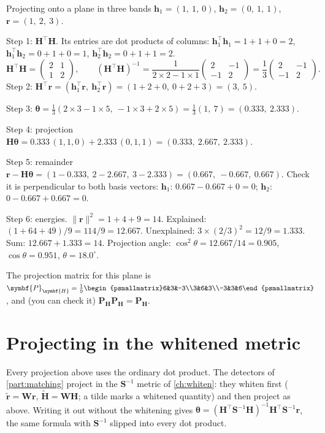 \documentclass[11pt,a4paper,oneside,openany]{book}
\newcommand{\B}[1]{{\symbf{#1}}}
\newcommand{\B}[1]{{\bm{#1}}}
\newcommand{\T}{^{\top}}
\newcommand{\nrm}[1]{\lVert #1\rVert}
\newcommand{\vr}{\B{r}}
\newcommand{\vh}{\B{h}}
\newcommand{\vtheta}{\B{\theta}}
\newcommand{\mS}{\B{S}}
\newcommand{\mW}{\B{W}}
\newcommand{\mH}{\B{H}}
\newcommand{\mP}{\B{P}}
\begin{document}
\begin{worked}[label=we:projsub]{Projecting onto a plane in three bands}
$\vh_1=(1,\ 1,\ 0)$, $\vh_2=(0,\ 1,\ 1)$, $\vr=(1,\ 2,\ 3)$.

Step 1: $\mH\T\mH$. Its entries are dot products of columns: $\vh_1\T\vh_1=1+1+0=2$, $\vh_1\T\vh_2=0+1+0=1$, $\vh_2\T\vh_2=0+1+1=2$.
\[
  \mH\T\mH=\begin{pmatrix}2&1\\1&2\end{pmatrix},\qquad
  (\mH\T\mH)^{-1}=\frac1{2\times2-1\times1}\begin{pmatrix}2&-1\\-1&2\end{pmatrix}=\frac13\begin{pmatrix}2&-1\\-1&2\end{pmatrix}.
\]
Step 2: $\mH\T\vr=(\vh_1\T\vr,\ \vh_2\T\vr)=(1+2+0,\ 0+2+3)=(3,\ 5)$.

Step 3: $\vtheta=\frac13(2\times3-1\times5,\ -1\times3+2\times5)=\frac13(1,\ 7)=(0.333,\ 2.333)$.

Step 4: projection $\mH\vtheta=0.333\,(1,1,0)+2.333\,(0,1,1)=(0.333,\ 2.667,\ 2.333)$.

Step 5: remainder $\vr-\mH\vtheta=(1-0.333,\ 2-2.667,\ 3-2.333)=(0.667,\ -0.667,\ 0.667)$. Check it is perpendicular to both
basis vectors: $\vh_1$: $0.667-0.667+0=0$; $\vh_2$: $0-0.667+0.667=0$.

Step 6: energies. $\nrm{\vr}^2=1+4+9=14$. Explained: $(1+64+49)/9=114/9=12.667$. Unexplained: $3\times(2/3)^2=12/9=1.333$.
Sum: $12.667+1.333=14$. Projection angle: $\cos^2\theta=12.667/14=0.905$, $\cos\theta=0.951$, $\theta=18.0^\circ$.
\end{worked}

The projection matrix for this plane is $\mP_{\mH}=\frac19\begin{psmallmatrix}6&3&-3\\3&6&3\\-3&3&6\end{psmallmatrix}$, and (you can check
it) $\mP_{\mH}\mP_{\mH}=\mP_{\mH}$.

\section{Projecting in the whitened metric}

Every projection above uses the ordinary dot product. The detectors of \cref{part:matching} project in the $\mS^{-1}$ metric of
\cref{ch:whiten}: they whiten first ($\tilde{\vr}=\mW\vr$, $\tilde{\mH}=\mW\mH$; a tilde marks a whitened quantity) and then project
as above. Writing it out without the whitening gives $\vtheta=(\mH\T\mS^{-1}\mH)^{-1}\mH\T\mS^{-1}\vr$, the same formula with
$\mS^{-1}$ slipped into every dot product.
\end{document}
